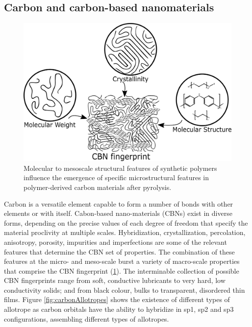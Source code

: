 \subsection{Carbon and carbon-based nanomaterials}

\begin{figure}[th]
\centering
\includegraphics[scale=0.40]{./Figures/CBNfingerprint.png}
\decoRule
\caption[CBN Fingerprint]{Molecular to mesoscale structural features of synthetic polymers influence the emergence of specific microstructural features in polymer-derived carbon materials after pyrolysis.}
\label{fig:CBNfingerprint}
\end{figure}

Carbon is a versatile element capable to form a number of bonds with other elements or with itself. Cabon-based nano-materials (CBNs) exist in diverse forms, depending on the precise values of each degree of freedom that specify the material proclivity at multiple scales. Hybridization, crystallization, percolation, anisotropy, porosity, impurities and imperfections are some of the relevant features that determine the CBN set of properties. The combination of these features at the micro- and meso-scale burst a variety of macro-scale properties that comprise the CBN fingerprint (\ref{fig:CBNfingerprint}). The interminable collection of possible CBN fingerprints range from soft, conductive lubricants to very hard, low conductivity solids; and from black colour, bulks to transparent, disordered thin films. \cite{McCreery2008} Figure \ref{fig:carbonAllotropes} shows the existence of different types of allotrope as carbon orbitals have the ability to hybridize in sp1, sp2 and sp3 configurations, assembling different types of allotropes.

